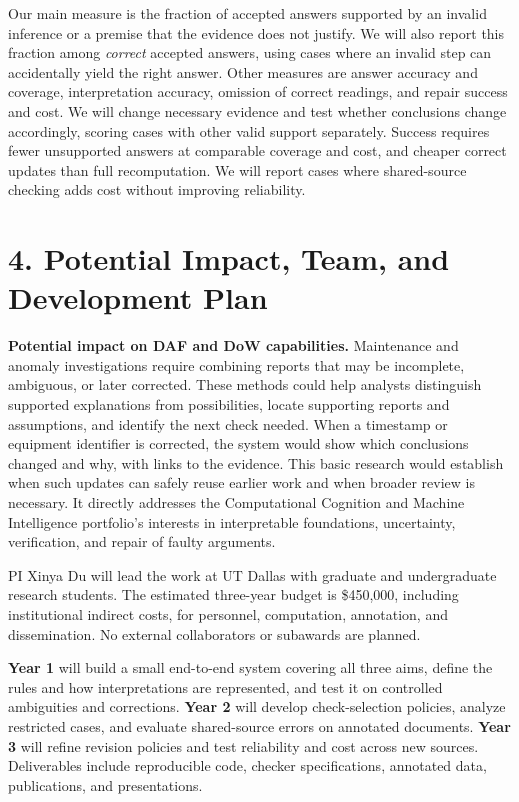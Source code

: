 \documentclass[12pt]{article}
\begin{document}
Our main measure is the fraction of accepted answers supported by an invalid inference or a premise that the evidence does not justify. We will also report this fraction among \emph{correct} accepted answers, using cases where an invalid step can accidentally yield the right answer. Other measures are answer accuracy and coverage, interpretation accuracy, omission of correct readings, and repair success and cost. We will change necessary evidence and test whether conclusions change accordingly, scoring cases with other valid support separately. Success requires fewer unsupported answers at comparable coverage and cost, and cheaper correct updates than full recomputation. We will report cases where shared-source checking adds cost without improving reliability.

\clearpage
\section*{4. Potential Impact, Team, and Development Plan}

\textbf{Potential impact on DAF and DoW capabilities.} Maintenance and anomaly investigations require combining reports that may be incomplete, ambiguous, or later corrected. These methods could help analysts distinguish supported explanations from possibilities, locate supporting reports and assumptions, and identify the next check needed. When a timestamp or equipment identifier is corrected, the system would show which conclusions changed and why, with links to the evidence. This basic research would establish when such updates can safely reuse earlier work and when broader review is necessary. It directly addresses the Computational Cognition and Machine Intelligence portfolio's interests in interpretable foundations, uncertainty, verification, and repair of faulty arguments.

PI Xinya Du will lead the work at UT Dallas with graduate and undergraduate research students. The estimated three-year budget is \$450,000, including institutional indirect costs, for personnel, computation, annotation, and dissemination. No external collaborators or subawards are planned.

\textbf{Year 1} will build a small end-to-end system covering all three aims, define the rules and how interpretations are represented, and test it on controlled ambiguities and corrections. \textbf{Year 2} will develop check-selection policies, analyze restricted cases, and evaluate shared-source errors on annotated documents. \textbf{Year 3} will refine revision policies and test reliability and cost across new sources. Deliverables include reproducible code, checker specifications, annotated data, publications, and presentations.

\clearpage
\setlength{\bibsep}{0pt}

  {}
  {}
\end{document}
